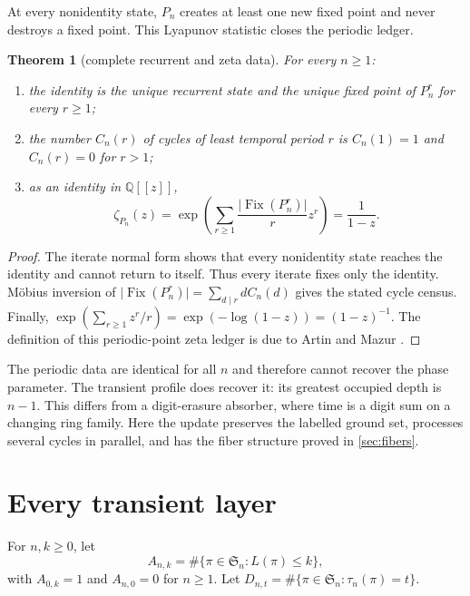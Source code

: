 \documentclass[11pt,a4paper]{amsart}
\newtheorem{theorem}{Theorem}[section]
\theoremstyle{definition}
\theoremstyle{remark}
\newcommand{\Sn}{\mathfrak S_n}
\newcommand{\Fix}{\operatorname{Fix}}
\newcommand{\card}[1]{\lvert #1\rvert}
\begin{document}
At every nonidentity state, $P_n$ creates at least one new fixed point and
never destroys a fixed point.  This Lyapunov statistic closes the periodic
ledger.

\begin{theorem}[complete recurrent and zeta data]\label{thm:zeta}
For every $n\geq1$:
\begin{enumerate}
\item the identity is the unique recurrent state and the unique fixed point
  of $P_n^r$ for every $r\geq1$;
\item the number $C_n(r)$ of cycles of least temporal period $r$ is
  $C_n(1)=1$ and $C_n(r)=0$ for $r>1$;
\item as an identity in $\mathbb Q[[z]]$,
  \[
   \zeta_{P_n}(z)
   =\exp\!\left(\sum_{r\geq1}
      \frac{\card{\Fix(P_n^r)}}r z^r\right)
   =\frac1{1-z}.
  \]
\end{enumerate}
\end{theorem}

\begin{proof}
The iterate normal form shows that every nonidentity state reaches the
identity and cannot return to itself.  Thus every iterate fixes only the
identity.  M\"obius inversion of
$\card{\Fix(P_n^r)}=\sum_{d\mid r}dC_n(d)$ gives the stated cycle census.
Finally,
$\exp(\sum_{r\geq1}z^r/r)=\exp(-\log(1-z))=(1-z)^{-1}$.
The definition of this periodic-point zeta ledger is due to Artin and Mazur
\cite{ArtinMazur1965}.
\end{proof}

The periodic data are identical for all $n$ and therefore cannot recover
the phase parameter.  The transient profile does recover it: its greatest
occupied depth is $n-1$.  This differs from a digit-erasure absorber, where
time is a digit sum on a changing ring family.  Here the update preserves
the labelled ground set, processes several cycles in parallel, and has the
fiber structure proved in \cref{sec:fibers}.

\section{Every transient layer}\label{sec:layers}

For $n,k\geq0$, let
\[
 A_{n,k}=\#\{\pi\in\Sn:L(\pi)\leq k\},
\]
with $A_{0,k}=1$ and $A_{n,0}=0$ for $n\geq1$.  Let
$D_{n,t}=\#\{\pi\in\Sn:\tau_n(\pi)=t\}$.
\end{document}
